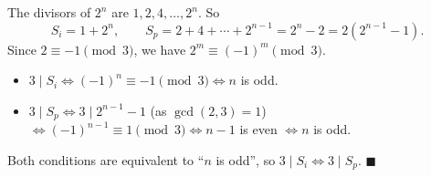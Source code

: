 The divisors of $2^n$ are $1,2,4,\dots,2^n$. So
\[
S_i=1+2^n,\qquad S_p=2+4+\cdots+2^{n-1}=2^n-2=2\left(2^{n-1}-1\right).
\]
Since $2\equiv-1\pmod3$, we have $2^m\equiv(-1)^m\pmod 3$.

\begin{itemize}
\item $3\mid S_i\iff(-1)^n\equiv-1\pmod3\iff n$ is odd.
\item $3\mid S_p\iff3\mid2^{n-1}-1$ (as $\gcd(2,3)=1$) $\iff(-1)^{n-1}\equiv1\pmod3\iff n-1$ is even $\iff n$ is odd.
\end{itemize}
Both conditions are equivalent to ``$n$ is odd'', so $3\mid S_i\iff3\mid S_p$. $\blacksquare$
